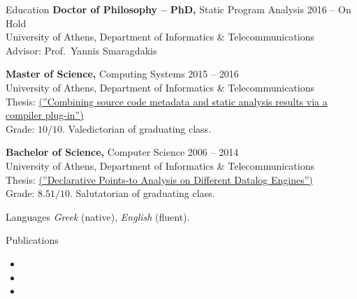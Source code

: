 \documentclass{resume}
\begin{document}
\newpage
\begin{rSection}{Education}
  {\bf Doctor of Philosophy -- PhD,} Static Program Analysis \hfill {2016 -- On Hold } \\
  University of Athens,  Department of Informatics \& Telecommunications \\
  Advisor: Prof.~Yannis Smaragdakis

  {\bf Master of Science,} Computing Systems \hfill {2015 -- 2016 } \\
  University of Athens,  Department of Informatics \& Telecommunications \\
  Thesis: \href{http://cgi.di.uoa.gr/~smaragd/theses/antoniadis2.pdf}{ (''Combining source code metadata and static analysis results via a compiler plug-in'')} \\
  Grade: $10 / 10$. Valedictorian of graduating class.

  {\bf Bachelor of Science,}  Computer Science \hfill {2006 -- 2014}  \\
  University of Athens,  Department of Informatics \& Telecommunications \\
  Thesis: \href{http://cgi.di.uoa.gr/~smaragd/theses/antoniadis.pdf}{ (''Declarative Points-to Analysis on Different Datalog Engines'')} \\
  Grade: $8.51 / 10$. Salutatorian of graduating class.
\end{rSection}

\begin{rSection}{Languages}
  \textit{Greek} (native), \textit{English} (fluent).
\end{rSection}

\begin{rSection}{Publications}
    \begin{itemize}[label={}, leftmargin=*, topsep=0.1pt]
      \setlength\itemsep{+0.5em}
        \item {}
        \item {}
        \item {}
    \end{itemize}
\end{rSection}
\end{document}
